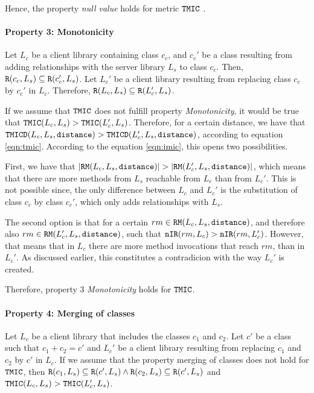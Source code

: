 Hence, the property \textit{null value} holds for metric $\verb|TMIC|$ .

\paragraph{Property 3: Monotonicity}
Let $L_c$ be a client library containing class $c_c$, and $c_c'$ be a class resulting from adding relationships with the server library $L_s$ to class $c_c$. Then, $\verb|R|(c_c, L_s) \subseteq \verb|R|(c_c', L_s)$. Let $L_c'$ be a client library resulting from replacing class $c_c$ by $c_c'$ in $L_c$. Therefore, $\verb|R|(L_c, L_s) \subseteq \verb|R|(L_c', L_s)$.

If we assume that $\verb|TMIC|$ does not fulfill property \textit{Monotonicity}, it would be true that $\verb|TMIC|(L_c, L_s) > \verb|TMIC|(L_c', L_s)$. Therefore, for a certain distance, we have that $\verb|TMICD|(L_c,L_s,\verb|distance|) > \verb|TMICD|(L_c',L_s,\verb|distance|)$, according to equation \ref{eqn:tmic}. According to the equation \ref{eqn:imic}, this opens two possibilities.

First, we have that $|\verb|RM|(L_c,L_s,\verb|distance|)| > |\verb|RM|(L_c',L_s,\verb|distance|)|$, which means that there are more methods from $L_s$ reachable from $L_c$ than from $L_c'$. This is not possible since, the only difference between $L_c$ and $L_c'$ is the substitution of class $c_c$ by class $c_c'$, which only adds relationships with $L_s$.

The second option is that for a certain $rm \in \verb|RM|(L_c,L_s,\verb|distance|)$, and therefore also $rm \in \verb|RM|(L_c',L_s,\verb|distance|)$, such that   $\verb|nIR|(rm,L_c) > \verb|nIR|(rm,L_c')$. However, that means that in $L_c$ there are more method invocations that reach $rm$, than in $L_c'$. As discussed earlier, this constitutes a contradicion with the way $L_c'$ is created.

Therefore, property 3 \textit{Monotonicity} holds for $\verb|TMIC|$.

\paragraph{Property 4: Merging of classes}
Let $L_c$ be a client library that includes the classes $c_1$ and $c_2$. Let $c'$ be a class such that $c_1 + c_2 = c'$ and $L_c'$ be a client library resulting from replacing $c_1$ and $c_2$ by $c'$ in $L_c$. If we assume that the property merging of classes does not hold for $\verb|TMIC|$, then $\verb|R|(c_1, L_s) \subseteq \verb|R|(c', L_s) \land \verb|R|(c_2, L_s) \subseteq \verb|R|(c', L_s)$ and $\verb|TMIC|(L_c, L_s) > \verb|TMIC|(L_c', L_s)$.

